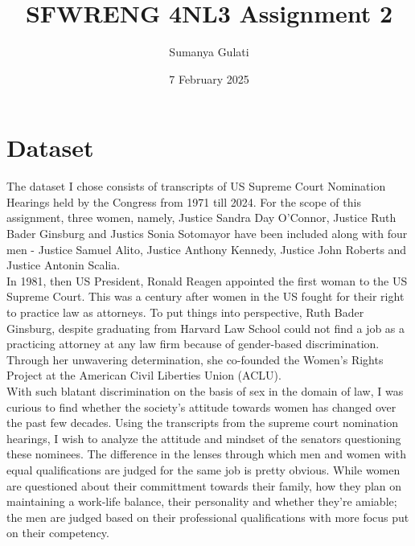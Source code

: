 \documentclass[titlepage]{article}
\title{SFWRENG 4NL3 Assignment 2}
\author{Sumanya Gulati}
\date{7 February 2025}
\begin{document}
\begin{titlepage}
    \maketitle
\end{titlepage}

\newpage 

\tableofcontents
\listoftables
\listoffigures

\newpage

\section{Dataset}
The dataset I chose consists of transcripts of US Supreme Court Nomination Hearings held by the Congress from 
1971 till 2024. For the scope of this assignment, three women, namely, Justice Sandra Day O'Connor, Justice Ruth 
Bader Ginsburg  and Justics Sonia Sotomayor have been included along with four men - Justice Samuel Alito, Justice 
Anthony Kennedy, Justice John Roberts and Justice Antonin Scalia.\\

In 1981, then US President, Ronald Reagen appointed the first woman to the US Supreme Court. This was a century after 
women in the US fought for their right to practice law as attorneys. To put things into perspective, Ruth Bader Ginsburg, 
despite graduating from Harvard Law School could not find a job as a practicing attorney at any law firm because of gender-based 
discrimination. Through her unwavering determination, she co-founded the Women's Rights Project at the American Civil Liberties 
Union (ACLU).\\

With such blatant discrimination on the basis of sex in the domain of law, I was curious to find whether the society's attitude 
towards women has changed over the past few decades. Using the transcripts from the supreme court nomination hearings, I wish to 
analyze the attitude and mindset of the senators questioning these nominees. The difference in the lenses through which men and 
women with equal qualifications are judged for the same job is pretty obvious. While women are questioned about their committment 
towards their family, how they plan on maintaining a work-life balance, their personality and whether they're amiable; the men
are judged based on their professional qualifications with more focus put on their competency.\\
\end{document}
